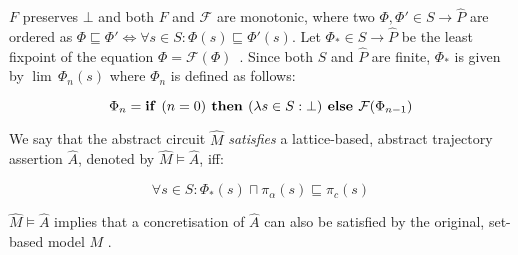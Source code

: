 \noindent $F$ preserves $\bot$ and both $F$ and $\mathcal{F}$ are monotonic, where two $\Phi, \Phi' \in S \rightarrow \hat P$ are ordered as $\Phi \sqsubseteq \Phi' \iff \forall s \in S : \Phi(s) \sqsubseteq \Phi'(s)$. Let $\Phi_{*} \in S \rightarrow \hat P$ be the least fixpoint of the equation $\Phi = \mathcal{F}(\Phi)$~\cite{davey2002}. Since both $S$ and $\hat P$ are finite, $\Phi_{*}$ is given by $\lim \, \Phi_{n}(s)$ where $\Phi_{n}$ is defined as follows:

\begin{equation}
\Phi_{n} = \textrm{\textbf{if }} (n = 0) \textrm{\textbf{ then }} (\lambda s \in S : \bot) \textrm{\textbf{ else }} \mathcal{F}(\Phi_{n-1})
\end{equation}

We say that the abstract circuit $\hat M$ \textit{satisfies} a lattice-based, abstract trajectory assertion $\hat A$, denoted by $\hat M \models \hat A$, iff:

\begin{equation}
\forall s \in S : \Phi_{*}(s) \sqcap \pi_{\alpha}(s) \sqsubseteq \pi_{c}(s)
\end{equation}

\noindent $\hat M \models \hat A$ implies that a concretisation of $\hat A$ can also be satisfied by the original, set-based model $M$ \cite{chou1999}.
